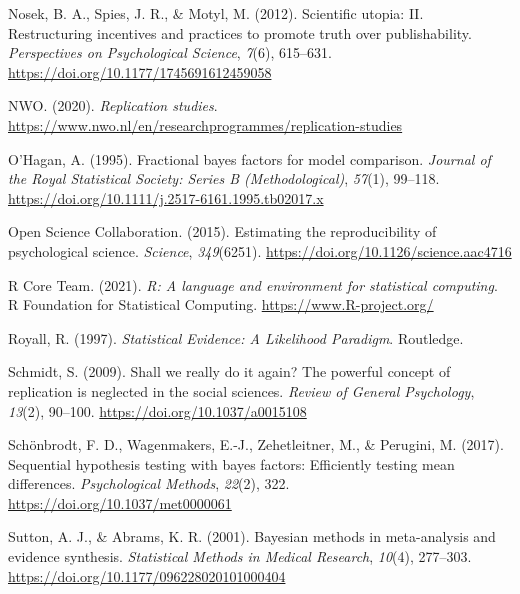 \documentclass[
]{interact}
\newlength{\cslhangindent}
\newlength{\cslentryspacingunit} %
\newenvironment{CSLReferences}[2] %
 {%
  \setlength{\parindent}{0pt}
  \ifodd #1
  \let\oldpar\par
  \def\par{\hangindent=\cslhangindent\oldpar}
  \fi
  \setlength{\parskip}{#2\cslentryspacingunit}
 }%
 {}
\begin{document}
\begin{CSLReferences}{1}{0}
\leavevmode{}%
Nosek, B. A., Spies, J. R., \& Motyl, M. (2012). Scientific utopia: II.
Restructuring incentives and practices to promote truth over
publishability. \emph{Perspectives on Psychological Science},
\emph{7}(6), 615--631. \url{https://doi.org/10.1177/1745691612459058}

\leavevmode{}%
NWO. (2020). \emph{Replication studies}.
\url{https://www.nwo.nl/en/researchprogrammes/replication-studies}

\leavevmode{}%
O'Hagan, A. (1995). Fractional bayes factors for model comparison.
\emph{Journal of the Royal Statistical Society: Series B
(Methodological)}, \emph{57}(1), 99--118.
\url{https://doi.org/10.1111/j.2517-6161.1995.tb02017.x}

\leavevmode{}%
Open Science Collaboration. (2015). Estimating the reproducibility of
psychological science. \emph{Science}, \emph{349}(6251).
\url{https://doi.org/10.1126/science.aac4716}

\leavevmode{}%
R Core Team. (2021). \emph{R: A language and environment for statistical
computing}. R Foundation for Statistical Computing.
\url{https://www.R-project.org/}

\leavevmode{}%
Royall, R. (1997). \emph{{S}tatistical {E}vidence: A {L}ikelihood
{P}aradigm}. Routledge.

\leavevmode{}%
Schmidt, S. (2009). Shall we really do it again? The powerful concept of
replication is neglected in the social sciences. \emph{Review of General
Psychology}, \emph{13}(2), 90--100.
\url{https://doi.org/10.1037/a0015108}

\leavevmode{}%
Schönbrodt, F. D., Wagenmakers, E.-J., Zehetleitner, M., \& Perugini, M.
(2017). Sequential hypothesis testing with bayes factors: Efficiently
testing mean differences. \emph{Psychological Methods}, \emph{22}(2),
322. \url{https://doi.org/10.1037/met0000061}

\leavevmode{}%
Sutton, A. J., \& Abrams, K. R. (2001). Bayesian methods in
meta-analysis and evidence synthesis. \emph{Statistical Methods in
Medical Research}, \emph{10}(4), 277--303.
\url{https://doi.org/10.1177/096228020101000404}


\end{CSLReferences}
\end{document}
